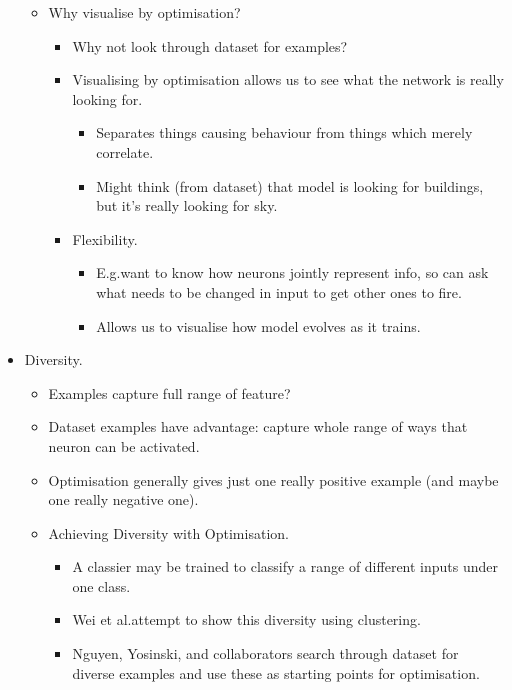 \begin{itemize}
\begin{itemize}
\begin{itemize}
\begin{itemize}
            \end{itemize}
        \end{itemize}
        \item Why visualise by optimisation?
        \begin{itemize}
            \item Why not look through dataset for examples?
            \item Visualising by optimisation allows us to see what the network is really looking for.
            \begin{itemize}
                \item Separates things causing behaviour from things which merely correlate.
                \item Might think (from dataset) that model is looking for buildings, but it's really looking for sky.
            \end{itemize}
            \item Flexibility.
            \begin{itemize}
                \item E.g.\@ want to know how neurons jointly represent info, so can ask what needs to be changed in input to get other ones to fire.
                \item Allows us to visualise how model evolves as it trains.
            \end{itemize}
        \end{itemize}
    \end{itemize}
    \pagebreak
    \item Diversity.
    \begin{itemize}
        \item Examples capture full range of feature?
        \item Dataset examples have advantage: capture whole range of ways that neuron can be activated.
        \item Optimisation generally gives just one really positive example (and maybe one really negative one).
        \item Achieving Diversity with Optimisation.
        \begin{itemize}
            \item A classier may be trained to classify a range of different inputs under one class.
            \item Wei et al.\@ attempt to show this diversity using clustering.
            \item Nguyen, Yosinski, and collaborators search through dataset for diverse examples and use these as starting points for optimisation.

\end{itemize}
\end{itemize}
\end{itemize}
